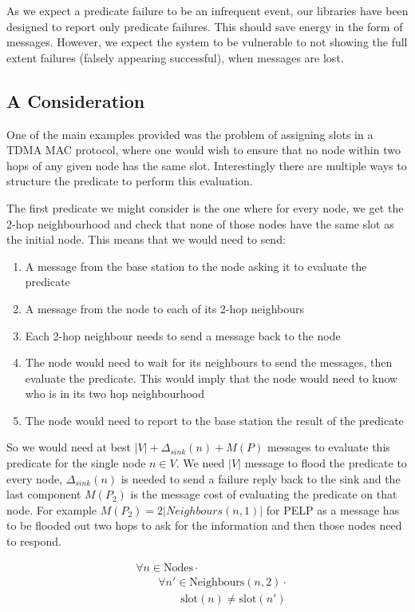 As we expect a predicate failure to be an infrequent event, our libraries have been designed to report only predicate failures. This should save energy in the form of messages. However, we expect the system to be vulnerable to not showing the full extent failures (falsely appearing successful), when messages are lost.


\subsection{A Consideration}

One of the main examples provided was the problem of assigning slots in a TDMA MAC protocol, where one would wish to ensure that no node within two hops of any given node has the same slot. Interestingly there are multiple ways to structure the predicate to perform this evaluation.


The first predicate we might consider is the one where for every node, we get the 2-hop neighbourhood and check that none of those nodes have the same slot as the initial node. This means that we would need to send:
\begin{enumerate}
	\item A message from the base station to the node asking it to evaluate the predicate
	\item A message from the node to each of its 2-hop neighbours
	\item Each 2-hop neighbour needs to send a message back to the node
	\item The node would need to wait for its neighbours to send the messages, then evaluate the predicate. This would imply that the node would need to know who is in its two hop neighbourhood
	\item The node would need to report to the base station the result of the predicate
\end{enumerate}

So we would need at best $|V| + \Delta_{sink}(n) + M(P)$ messages to evaluate this predicate for the single node $n \in V$. We need $|V|$ message to flood the predicate to every node, $\Delta_{sink}(n)$ is needed to send a failure reply back to the sink and the last component $M(P_{2})$ is the message cost of evaluating the predicate on that node. For example $M(P_{2}) = 2|Neighbours(n, 1)|$ for PELP as a message has to be flooded out two hops to ask for the information and then those nodes need to respond.

\begin{align}
\label{eq:2-hop-slot-pred}
& 				\forall n \in \text{Nodes} \cdot \\
& \hspace{2em}		\forall n' \in \text{Neighbours}(n, 2) \cdot \\
& \hspace{4em}			\text{slot}(n) \neq \text{slot}(n')
\end{align}

